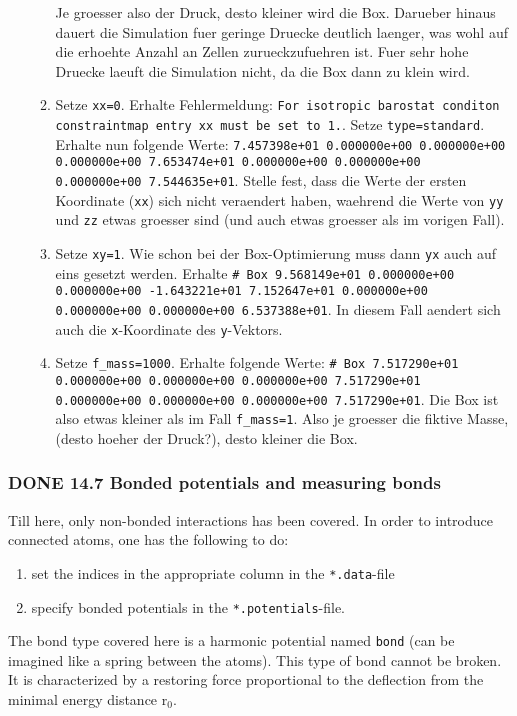 \documentclass[11pt]{article}
\begin{document}
\begin{itemize}
\begin{enumerate}
          Je groesser also der Druck, desto kleiner wird die Box. Darueber hinaus dauert die Simulation fuer geringe Druecke deutlich laenger, was wohl auf die erhoehte Anzahl an Zellen zurueckzufuehren ist. Fuer sehr hohe Druecke laeuft die Simulation nicht, da die Box dann zu klein wird.
\item Setze \texttt{xx=0}. Erhalte Fehlermeldung: \texttt{For isotropic barostat conditon constraintmap entry xx must be set to 1.}. Setze \texttt{type=standard}. Erhalte nun folgende Werte: \texttt{7.457398e+01 0.000000e+00    0.000000e+00    0.000000e+00    7.653474e+01    0.000000e+00    0.000000e+00    0.000000e+00    7.544635e+01}.
          Stelle fest, dass die Werte der ersten Koordinate (\texttt{xx}) sich nicht veraendert haben, waehrend die Werte von \texttt{yy} und \texttt{zz} etwas groesser sind (und auch etwas groesser als im vorigen Fall).
\item Setze \texttt{xy=1}. Wie schon bei der Box-Optimierung muss dann \texttt{yx} auch auf eins gesetzt werden. Erhalte \texttt{\# Box   9.568149e+01    0.000000e+00    0.000000e+00    -1.643221e+01   7.152647e+01    0.000000e+00    0.000000e+00    0.000000e+00    6.537388e+01}.
          In diesem Fall aendert sich auch die \texttt{x}-Koordinate des \texttt{y}-Vektors.
\item Setze \texttt{f\_mass=1000}. Erhalte folgende Werte: \texttt{\# Box   7.517290e+01    0.000000e+00    0.000000e+00    0.000000e+00    7.517290e+01    0.000000e+00    0.000000e+00    0.000000e+00    7.517290e+01}. 
          Die Box ist also etwas kleiner als im Fall \texttt{f\_mass=1}. Also je groesser die fiktive Masse, (desto hoeher der Druck?), desto kleiner die Box.
\end{enumerate}
\end{itemize} %
\subsubsection{\textbf{DONE} 14.7 Bonded potentials and measuring bonds}
\label{sec-2.4.7}

Till here, only non-bonded interactions has been covered. In order to introduce connected atoms, one has the following to do:
\begin{enumerate}
\item set the indices in the appropriate column in the \texttt{*.data}-file
\item specify bonded potentials in the \texttt{*.potentials}-file.
\end{enumerate}
The bond type covered here is a harmonic potential named \texttt{bond} (can be imagined like a spring between the atoms). 
This type of bond cannot be broken. It is characterized by a restoring force proportional to the deflection from the minimal energy distance r$_0$.    
\end{document}
